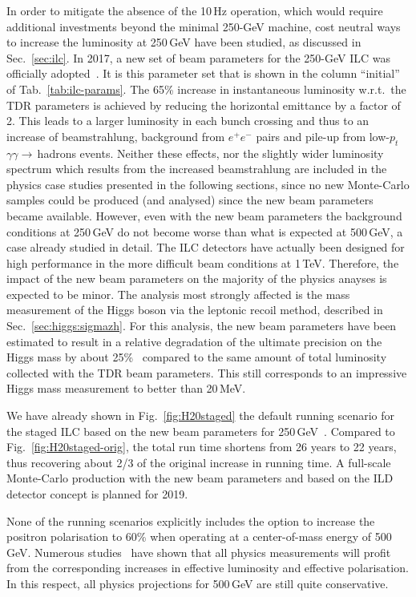 In order to mitigate the absence of the 10\,Hz operation, which would require additional investments beyond the minimal 250-GeV machine, cost neutral ways to increase the luminosity at 250\,GeV have been studied, as discussed in Sec.~\ref{sec:ilc}. In 2017, a new set of beam parameters for the 250-GeV ILC was officially adopted~\cite{bib:cr-0016}.  It is this parameter set that is shown in the column ``initial'' of Tab.~\ref{tab:ilc-params}. The 65\% increase in instantaneous luminosity w.r.t.\ the TDR parameters is achieved by reducing the horizontal emittance by a factor of 2. This leads to a larger luminosity in each bunch crossing and thus to an increase of beamstrahlung, background from $e^+e^-$ pairs and pile-up from low-$p_t$ $\gamma\gamma \to$\,hadrons events. Neither these effects, nor the slightly wider luminosity spectrum which results from the increased beamstrahlung are included in the physics case studies presented in the following sections, since no new Monte-Carlo samples could be produced (and analysed) since the new beam parameters became available. However, even with the new beam parameters the background conditions at 250\,GeV do not become worse than what is expected at 500\,GeV, a case already studied in detail.  The ILC detectors have actually been designed for high performance in the more difficult  beam conditions at 1\,TeV. Therefore, the impact of the new beam parameters on the majority of the physics anayses is expected to be minor. The analysis most strongly affected is the mass measurement of the Higgs boson via the leptonic recoil method, described in Sec.~\ref{sec:higgs:sigmazh}. For this analysis, the new beam parameters have been estimated to result in a relative degradation of the ultimate precision on the Higgs mass by about 25\%~\cite{bib:jeans_awlc17} compared to the same amount of total luminosity collected with the TDR beam parameters.  This still corresponds to an impressive 
Higgs mass measurement to better than 20\,MeV. 

We have already shown in Fig.~\ref{fig:H20staged} the default running scenario for the staged ILC based on the new beam parameters for 250\,GeV~\cite{bib:cr-0016}. Compared to Fig.~\ref{fig:H20staged-orig}, the total run time shortens from 26 years to 22 years, thus recovering about 2/3 of the original increase in running time. A full-scale Monte-Carlo production with the new beam parameters and based on the ILD detector concept is planned for 2019.


None of the running scenarios explicitly includes the option to increase the positron polarisation to 60\% when operating at a center-of-mass energy of 500\,GeV. Numerous studies~\cite{Fujii:2018mli, Habermehl:417605, Moortgat-Picka:2015yla, Aurand:2009kp, MoortgatPick:2005cw} have shown that all physics measurements will profit from the corresponding increases in effective luminosity and effective polarisation. In this respect, all physics projections for 500\,GeV are still quite conservative.
